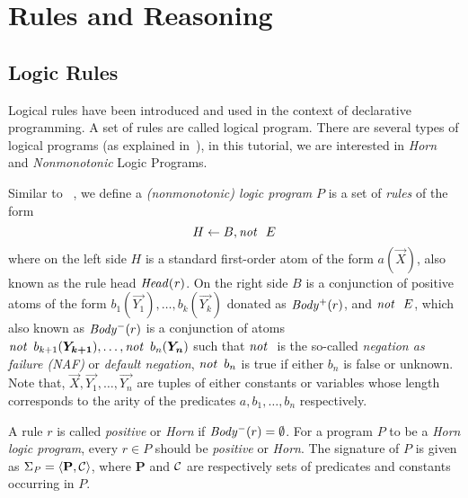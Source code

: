 \section{Rules and Reasoning}
\label{sec:reasoning}

\subsection{Logic Rules} Logical rules have been introduced and used in the context of declarative programming. A set of rules are called logical program. There are several types of logical programs (as explained in~\cite{DBLP:books/sp/Lloyd87}), in this tutorial, we are interested in \textit{Horn} and \textit{Nonmonotonic} Logic Programs.

Similar to ~\cite{DBLP:books/sp/Lloyd87}, we define a \emph{(nonmonotonic) logic program} $P$ is a set of \emph{rules} of the form
\begin{equation}
H\leftarrow B, \mathit{not}~ \ E
\end{equation}
 where on the left side $H$ is a standard first-order atom of the form $a(\vec{X})$, also known as the rule head $\mathit{Head(r)}$. On the right side $B$ is a conjunction of positive atoms of the form $b_1(\vec{Y_1}),\dotsc,b_k(\vec{Y_k})$ donated as $\mathit{Body^+}(r)$, and $\mathit{not}~ \ E$, which also known as $\mathit{Body^-}(r)$%
 is a conjunction of atoms $\naf\, b_{k+1}(\vec{Y_{k+1}}),\dotsc,\naf\, b_n(\vec{Y_{n}})$ such that $\naf$ is the so-called \emph{negation as failure (NAF)} or \emph{default negation}, \ie $\mathit{not}~ \, b_n$ is true if either $b_n$ is false or unknown. Note that, $\vec{X},\vec{Y_1},\ldots,\vec{Y_{n}}$ are tuples of either constants or variables whose length corresponds to the arity of the predicates $a,b_1,\ldots,b_n$ respectively.
 


A rule $r$ is called \emph{positive} or
\emph{Horn} if $\mathit{Body^-}(r)=\emptyset$. For a program $P$ to be a \textit{Horn logic program}, every $r \in P$ should be \emph{positive} or \emph{Horn}. 
  The signature of $P$ is given as $\Sigma_{\mathit{P}}=\langle\mathbf{P},\mathcal{C}\rangle$, where $\mathbf{P}$ and $\mathcal{C}$ are respectively sets of predicates and constants occurring in $P$. 
  

